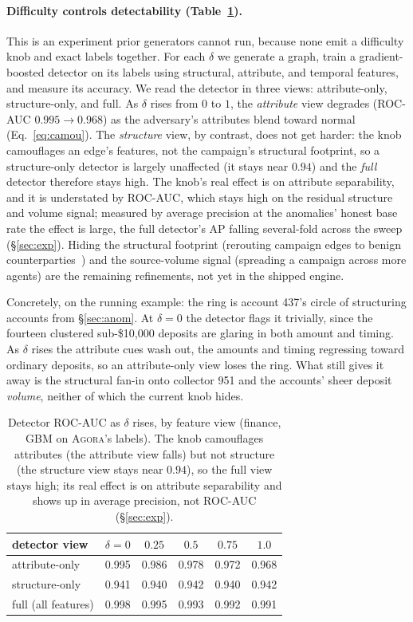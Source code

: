 \documentclass[sigconf,review,anonymous]{acmart}
\newcommand{\sys}{\textsc{Agora}\xspace}
\begin{document}
\paragraph{Difficulty controls detectability (Table~\ref{tab:diff}).}
This is an experiment prior generators cannot run, because none emit a difficulty knob
and exact labels together. For each $\delta$ we generate a graph, train a
gradient-boosted detector on its labels using structural, attribute, and temporal
features, and measure its accuracy. We read the detector in three views: attribute-only,
structure-only, and full. As $\delta$ rises from $0$ to $1$, the \emph{attribute} view
degrades (ROC-AUC $0.995\!\to\!0.968$) as the adversary's attributes blend toward normal
(Eq.~\ref{eq:camou}). The \emph{structure} view, by contrast, does not get harder: the
knob camouflages an edge's features, not the campaign's structural footprint, so a
structure-only detector is largely unaffected (it stays near $0.94$) and the \emph{full}
detector therefore stays high. The knob's real effect is on attribute separability, and
it is understated by ROC-AUC, which stays high on the residual structure and volume
signal; measured by average precision at the anomalies' honest base rate the effect is
large, the full detector's AP falling several-fold across the sweep (\S\ref{sec:exp}).
Hiding the structural footprint (rerouting campaign edges to benign
counterparties~\cite{dou2020caregnn}) and the source-volume signal (spreading a campaign
across more agents) are the remaining refinements, not yet in the shipped engine.


Concretely, on the running example: the ring is account 437's circle of structuring
accounts from \S\ref{sec:anom}. At $\delta{=}0$ the detector flags it trivially, since
the fourteen clustered sub-\$10{,}000 deposits are glaring in both amount and timing. As
$\delta$ rises the attribute cues wash out, the amounts and timing regressing toward
ordinary deposits, so an attribute-only view loses the ring. What still gives it away is
the structural fan-in onto collector 951 and the accounts' sheer deposit \emph{volume},
neither of which the current knob hides.

\begin{table}[t]
\centering
\small
\caption{Detector ROC-AUC as $\delta$ rises, by feature view (finance, GBM on \sys{}'s
labels). The knob camouflages attributes (the attribute view falls) but not structure
(the structure view stays near $0.94$), so the full view stays high; its real effect is
on attribute separability and shows up in average precision, not ROC-AUC (\S\ref{sec:exp}).}
\label{tab:diff}
\setlength{\tabcolsep}{6.5pt}
\begin{tabular}{@{}lccccc@{}}
\toprule
detector view & $\delta{=}0$ & $0.25$ & $0.5$ & $0.75$ & $1.0$ \\
\midrule
attribute-only & 0.995 & 0.986 & 0.978 & 0.972 & 0.968 \\
structure-only & 0.941 & 0.940 & 0.942 & 0.940 & 0.942 \\
full (all features) & 0.998 & 0.995 & 0.993 & 0.992 & 0.991 \\
\bottomrule
\end{tabular}
\end{table}
\end{document}
